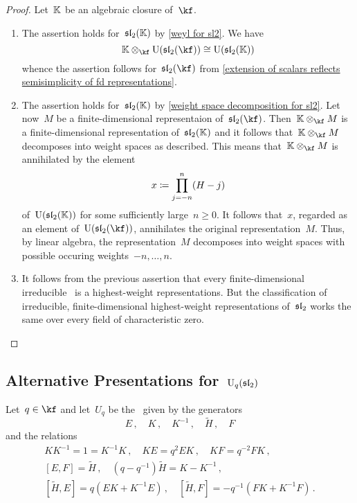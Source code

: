 \documentclass[a4paper, 11pt, oneside]{scrartcl}
\begin{document}
\begin{proof}
  Let~$\mathbb{K}$ be an algebraic closure of~$\kf$.
  \begin{enumerate}
    \item
      The assertion holds for~$\mathfrak{sl}_2(\mathbb{K})$ by \cref{weyl for sl2}.
      We have
      \[
        \Kf \tensor_{\kf} \Univ(\sllie_2(\kf))
        \cong
        \Univ(\sllie_2(\Kf))
      \]
      whence the assertion follows for~$\sllie_2(\kf)$ from \cref{extension of scalars reflects semisimplicity of fd representations}.
    \item
      The assertion holds for~$\mathfrak{sl}_2(\mathbb{K})$ by \cref{weight space decomposition for sl2}.
      Let now~$M$ be a finite-dimensional representaion of~$\sllie_2(\kf)$.
      Then~$\Kf \tensor_{\kf} M$ is a finite-dimensional representation of~$\mathfrak{sl}_2(\mathbb{K})$ and it follows that~$\Kf \tensor_{\kf} M$ decomposes into weight spaces as described.
      This means that~$\Kf \tensor_{\kf} M$ is annihilated by the element
      \[
        x \coloneqq \prod_{j=-n}^n (H - j)
      \]
      of~$\operatorname{U}(\mathfrak{sl}_2(\mathbb{K}))$ for some sufficiently large~$n \geq 0$.
      It follows that~$x$, regarded as an element of~$\Univ(\sllie_2(\kf))$, annihilates the original representation~$M$.
      Thus, by linear algebra, the representation~$M$ decomposes into weight spaces with possible occuring weights~$-n, \dotsc, n$.
    \item
      It follows from the previous assertion that every finite-dimensional irreducible~ is a highest-weight representations.
      But the classification of irreducible, finite-dimensional highest-weight representations of~$\mathfrak{sl}_2$ works the same over every field of characteristic zero.
    \qedhere
  \end{enumerate}
\end{proof}



\subsection{Alternative Presentations for~\texorpdfstring{$\operatorname{U}_q(\mathfrak{sl}_2)$}{Uq(sl2)}}
\label{alternative presentation for quantum sl2}

Let~$q \in \kf$ and let~$U_q$ be the~\algebra{$\kf$} given by the generators
\[
  E \,,
  \quad
  K \,,
  \quad
  K^{-1}  \,,
  \quad
  \widetilde{H} \,,
  \quad
  F
\]
and the relations
\begin{gather*}
  K K^{-1} = 1 = K^{-1} K \,,
  \quad
  KE = q^2 EK \,,
  \quad
  KF = q^{-2} FK \,,
  \\
  [E,F] = \widetilde{H} \,,
  \quad
  (q - q^{-1}) \widetilde{H} = K - K^{-1} \,,
  \\
  [\widetilde{H}, E] = q(EK + K^{-1} E) \,,
  \quad
  [\widetilde{H}, F] = -q^{-1}(FK + K^{-1} F) \,.
\end{gather*}
\end{document}
